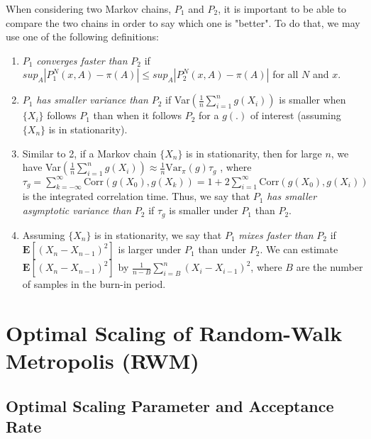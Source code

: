 \documentclass[twoside]{article}
\begin{document}
When considering two Markov chains, $P_1$ and $P_2$, it is important to be able to compare the two chains in order to say which one is "better". To do that, we may use one of the following definitions:
\begin{enumerate}
	\item $P_1$ \textit{converges faster than} $P_2$ if $sup_A|P_1^N(x,A) -  \pi(A)| \le sup_A|P_2^N(x,A) - \pi(A)|$ for all $N$ and $x$.
	\item $P_1$ \textit{has smaller variance than} $P_2$ if Var$(\frac{1}{n}\sum_{i=1}^n g(X_i))$ is smaller when $\{X_i\}$ follows $P_1$ than when it follows $P_2$ for a $g(.)$ of interest (assuming $\{X_n\}$ is in stationarity).
	\item Similar to 2, if a Markov chain $\{X_n\}$ is in stationarity, then for large $n$, we have 
	Var$(\frac{1}{n} \sum_{i=1}^n g(X_i)) \approx \frac{1}{n}\text{Var}_{\pi}(g) \tau_g$
	, where $\tau_g = \sum_{k= -\infty}^\infty \text{Corr}(g(X_0), g(X_k)) = 1 + 2 \sum_{i=1}^{\infty} \text{Corr}(g(X_0),g(X_i))$ is the integrated correlation time. Thus, we say that $P_1$ \textit{has smaller asymptotic variance than} $P_2$ if $\tau_g$ is smaller under $P_1$ than $P_2$.
	\item Assuming $\{X_n\}$ is in stationarity, we  say that $P_1$ \textit{mixes faster than} $P_2$ if $\mathbf{E}[(X_n - X_{n-1})^2]$ is larger under $P_1$ than under $P_2$. We can estimate $\mathbf{E}[(X_n - X_{n-1})^2]$ by $\frac{1}{n-B}\sum_{i=B}^n(X_i - X_{i-1})^2$, where $B$ are the number of samples in the burn-in period.
\end{enumerate}

\section{Optimal Scaling of Random-Walk Metropolis (RWM)}

\subsection{Optimal Scaling Parameter and Acceptance Rate}
\end{document}
